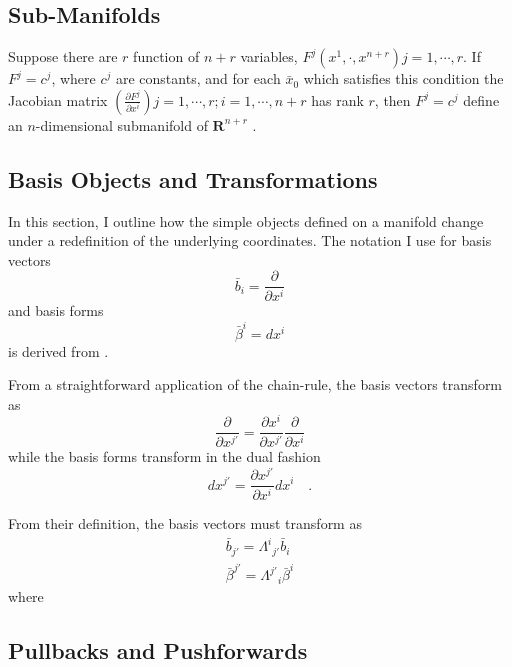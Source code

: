 \documentclass[twocolumn]{article}
\def\.{{\quad .}}
\begin{document}
\subsection{Sub-Manifolds}
Suppose there are $r$ function of $n+r$ variables, $F^{j}(x^1, \cdot, 
x^{n+r}) j = 1, \cdots, r$.  If $F^j = c^j$, where $c^j$ are 
constants, and for each ${\bar x}_0$ which satisfies this condition 
the Jacobian matrix $\left( \frac{\partial F^j}{\partial x^i} \right) 
j = 1, \cdots, r; i = 1, \cdots, n+r$ has rank $r$, then $F^j = c^j$ 
define an $n$-dimensional submanifold of $\mathbf{R}^{n+r}$ 
\cite{frankel}.

\subsection{Basis Objects and Transformations}\label{SS:basis_obj}

In this section, I outline how the simple objects defined on a 
manifold change under a redefinition of the underlying coordinates.  
The notation I use for basis vectors
\begin{equation}
   {\bar b}_i = \frac{\partial}{\partial x^i}
\end{equation}
and basis forms 
\begin{equation}
   {\bar \beta}^i = d x^i
\end{equation}
is derived from \cite{gock_schuck}.

From a straightforward application of the chain-rule, the basis 
vectors transform as 
\begin{equation}
   \frac{\partial}{\partial x^{j'}} = 
          \frac{\partial x^i}{\partial x^{j'}}                           
          \frac{\partial}{\partial x^i}
\end{equation}
while the basis forms transform in the dual fashion
\begin{equation}
   d x^{j'} = \frac{\partial x^{j'}}{\partial x^{i}} d x^i \.
\end{equation}

From their definition, the basis vectors must transform as
\begin{eqnarray}
   {\bar b}_{j'} = {\Lambda^i}_{j'} {\bar b}_{i} \\
   {\bar \beta}^{j'} = {\Lambda^{j'}}_{i} {\bar \beta}^{i}
\end{eqnarray}
where 



\subsection{Pullbacks and Pushforwards}\label{SS:pull_push}
\end{document}
